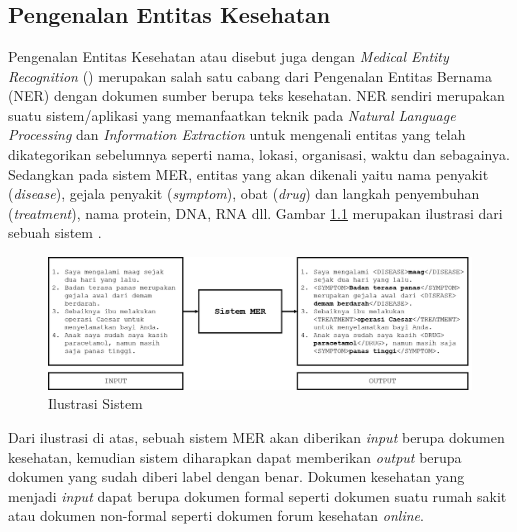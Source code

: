 \chapter{\babDua}

\section{Pengenalan Entitas Kesehatan}\label{aboutmer}
Pengenalan Entitas Kesehatan atau disebut juga dengan \textit{Medical Entity Recognition} (\mer) merupakan salah satu cabang dari Pengenalan Entitas Bernama (NER) dengan dokumen sumber berupa teks kesehatan. NER sendiri merupakan suatu sistem/aplikasi yang memanfaatkan teknik pada \textit{Natural Language Processing} dan \textit{Information Extraction} untuk mengenali entitas yang telah dikategorikan sebelumnya seperti nama, lokasi, organisasi, waktu dan sebagainya. Sedangkan pada sistem MER, entitas yang akan dikenali yaitu nama penyakit (\textit{disease}), gejala penyakit (\textit{symptom}), obat (\textit{drug}) dan langkah penyembuhan (\textit{treatment}), nama protein, DNA, RNA dll. Gambar \ref{fig:mer_ilustration} merupakan ilustrasi dari sebuah sistem \mer.

\begin{figure}
	\centering
	\includegraphics[width=1.0\linewidth]{images/mer_ilustration}
	\caption{Ilustrasi Sistem \mer}
	\label{fig:mer_ilustration}
\end{figure}

Dari ilustrasi di atas, sebuah sistem MER akan diberikan \textit{input} berupa dokumen kesehatan, kemudian sistem diharapkan dapat memberikan \textit{output} berupa dokumen yang sudah diberi label dengan benar. Dokumen kesehatan yang menjadi \textit{input} dapat berupa dokumen formal seperti dokumen suatu rumah sakit atau dokumen non-formal seperti dokumen forum kesehatan \textit{online}.

